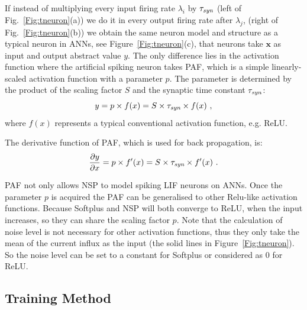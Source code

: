 	
	If instead of multiplying every input firing rate $\lambda_i$ by $\tau_{\textit{\textrm{syn}}}$ (left of Fig.~\ref{Fig:tneuron}(a)) we do it in every output firing rate after $\lambda_j$, (right of Fig.~\ref{Fig:tneuron}(b)) we obtain the same neuron model and structure as a typical neuron in ANNs, see Figure~\ref{Fig:tneuron}(c), that neurons take $\mathbf{x}$ as input and output abstract value $y$.
	The only difference lies in the activation function where the artificial spiking neuron takes PAF, which is a simple linearly-scaled activation function with a parameter $p$.
	The parameter is determined by the product of the scaling factor $S$ and the synaptic time constant $\tau_{\textit{\textrm{syn}}}$:
	\begin{equation}
	y = p \times f(x) = S \times \tau_{\textit{\textrm{syn}}} \times f(x)~,
	\label{equ:PAF}
	\end{equation}
	where $f(x)$ represents a typical conventional activation function, e.g. ReLU.
	
	
	The derivative function of PAF, which is used for back propagation, is:
	\begin{equation}
	\frac{\partial y}{\partial x} = p \times f'(x) = S \times \tau_{\textit{\textrm{syn}}} \times f'(x)~.
	\end{equation}
	
	PAF not only allows NSP to model spiking LIF neurons on ANNs.
	Once the parameter $p$ is acquired the PAF can be generalised to other Relu-like activation functions.
	Because Softplus and NSP will both converge to ReLU, when the input increases, so they can share the scaling factor $p$.
	Note that the calculation of noise level is not necessary for other activation functions, thus they only take the mean of the current influx as the input (the solid lines in Figure~\ref{Fig:tneuron}).
	So the noise level can be set to a constant for Softplus or considered as 0 for ReLU.
	
	\subsection{Training Method}
	\label{subsec:ns_train}
	
